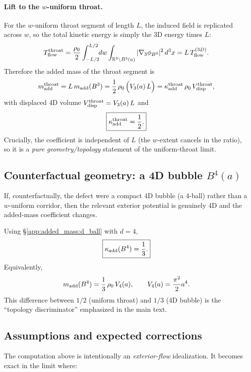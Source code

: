 \documentclass[11pt]{article}
\begin{document}
\paragraph{Lift to the $w$-uniform throat.}
For the $w$-uniform throat segment of length $L$, the induced field is replicated
across $w$, so the total kinetic energy is simply the 3D energy times $L$:
\begin{align}
T_{\rm flow}^{\rm throat}
=
\frac{\rho_0}{2}\int_{-L/2}^{L/2}\!\!dw
\int_{\mathbb R^3\setminus B^3(a)}
|\nabla_3\phi_{B^3}|^2\,d^3x
=
L\,T_{\rm flow}^{(3D)}.
\end{align}
Therefore the added mass of the throat segment is
\begin{align}
m_{\rm add}^{\rm throat}
=
L\,m_{\rm add}(B^3)
=
\frac{1}{2}\,\rho_0\,\Big(V_3(a)\,L\Big)
=
\kappa_{\rm add}^{\rm throat}\,\rho_0\,V_{\rm disp}^{\rm throat},
\end{align}
with displaced 4D volume $V_{\rm disp}^{\rm throat}=V_3(a)\,L$ and
\begin{align}
\boxed{
\kappa_{\rm add}^{\rm throat}=\frac{1}{2}.
}
\end{align}
Crucially, the coefficient is independent of $L$ (the $w$-extent cancels in the
ratio), so it is a \emph{pure geometry/topology} statement of the uniform-throat
limit.

\subsection{Counterfactual geometry: a 4D bubble $B^4(a)$}
\label{app:added_mass:bubble}
If, counterfactually, the defect were a compact 4D bubble (a 4-ball) rather than
a $w$-uniform corridor, then the relevant exterior potential is genuinely 4D and
the added-mass coefficient changes.

Using \S\ref{app:added_mass:d_ball} with $d=4$,
\begin{align}
\boxed{
\kappa_{\rm add}(B^4)=\frac{1}{3}.
}
\end{align}
Equivalently,
\begin{align}
m_{\rm add}(B^4)
=
\frac{1}{3}\,\rho_0\,V_4(a),
\qquad
V_4(a)=\frac{\pi^2}{2}a^4.
\end{align}
This difference between $1/2$ (uniform throat) and $1/3$ (4D bubble) is the
``topology discriminator'' emphasized in the main text.

\subsection{Assumptions and expected corrections}
The computation above is intentionally an \emph{exterior-flow} idealization.
It becomes exact in the limit where:
\end{document}
